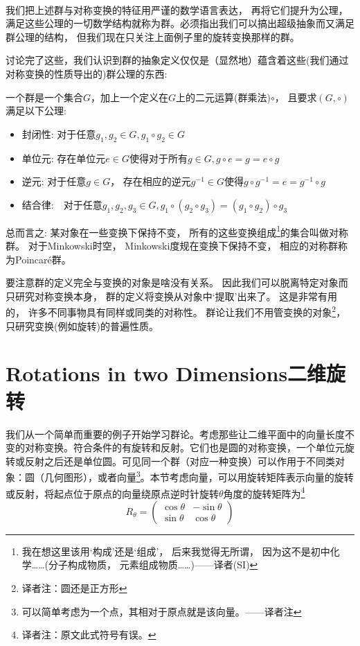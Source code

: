 \

我们把上述群与对称变换的特征用严谨的数学语言表达， 再将它们提升为公理， 满足这些公理的一切数学结构就称为群。必须指出我们可以搞出超级抽象而又满足群公理的结构， 但我们现在只关注上面例子里的旋转变换那样的群。

讨论完了这些，我们认识到群的抽象定义仅仅是（显然地）蕴含着这些(我们通过对称变换的性质导出的)群公理的东西:

一个群是一个集合$G$，加上一个定义在$G$上的二元运算(群乘法)$\circ$， 且要求$(G, \circ)$满足以下公理:
\begin{itemize}
	\item 封闭性: 对于任意$g_1, g_2 \in G, g_1 \circ g_2 \in G$

	\item 单位元: 存在单位元$e \in G$使得对于所有$g \in G, g\circ e = g = e \circ g$

	\item 逆元: 对于任意$g \in G$， 存在相应的逆元$g^{-1} \in G$使得$g \circ g^{-1} = e = g^{-1} \circ g$

	\item 结合律:　对于任意$g_1, g_2, g_3 \in G, g_1 \circ (g_2 \circ g_3) = (g_1 \circ g_2) \circ g_3$
\end{itemize}

总而言之: 某对象在一些变换下保持不变， 所有的这些变换组成\footnote{我在想这里该用`构成'还是`组成'， 后来我觉得无所谓， 因为这不是初中化学……(分子构成物质， 元素组成物质……)——译者(SI)}的集合叫做对称群。 对于Minkowski时空， Minkowski度规在变换下保持不变， 相应的对称群称为Poincar\'e群。

要注意群的定义完全与变换的对象是啥没有关系。 因此我们可以脱离特定对象而只研究对称变换本身， 群的定义将变换从对象中`提取'出来了。 这是非常有用的， 许多不同事物具有同样或同类的对称性。 群论让我们不用管变换的对象\footnote{译者注：圆还是正方形}， 只研究变换(例如旋转)的普遍性质。


\section[二维旋转]{Rotations in two Dimensions\quad 二维旋转}
\label{sec3.2}
我们从一个简单而重要的例子开始学习群论。考虑那些让二维平面中的向量长度不变的对称变换。符合条件的有旋转和反射。它们也是圆的对称变换，一个单位元旋转或反射之后还是单位圆。可见同一个群（对应一种变换）可以作用于不同类对象：圆（几何图形），或者向量\footnote{可以简单考虑为一个点，其相对于原点就是该向量。——译者注}。本节考虑向量，可以用旋转矩阵表示向量的旋转或反射，将起点位于原点的向量绕原点逆时针旋转$\theta$角度的旋转矩阵为\footnote{译者注：原文此式符号有误。}
\begin{equation}
\label{equ3.3}
R_\theta =
	\begin{pmatrix}
		\cos \theta & -\sin \theta \\
		\sin \theta & \cos \theta
	\end{pmatrix}
\end{equation}

